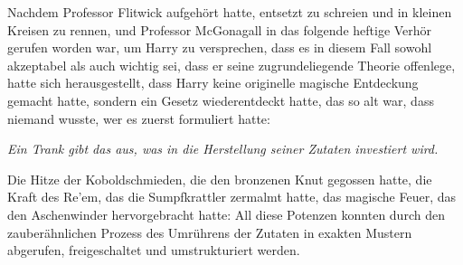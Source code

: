 Nachdem Professor Flitwick aufgehört hatte, entsetzt zu schreien und in kleinen Kreisen zu rennen, und Professor McGonagall in das folgende heftige Verhör gerufen worden war, um Harry zu versprechen, dass es in diesem Fall sowohl akzeptabel als auch wichtig sei, dass er seine zugrundeliegende Theorie offenlege, hatte sich herausgestellt, dass Harry keine originelle magische Entdeckung gemacht hatte, sondern ein Gesetz wiederentdeckt hatte, das so alt war, dass niemand wusste, wer es zuerst formuliert hatte:

\emph{Ein Trank gibt das aus, was in die Herstellung seiner Zutaten investiert wird.}

Die Hitze der Koboldschmieden, die den bronzenen Knut gegossen hatte, die Kraft des Re'em, das die Sumpfkrattler zermalmt hatte, das magische Feuer, das den Aschenwinder hervorgebracht hatte: All diese Potenzen konnten durch den zauberähnlichen Prozess des Umrührens der Zutaten in exakten Mustern abgerufen, freigeschaltet und umstrukturiert werden.

